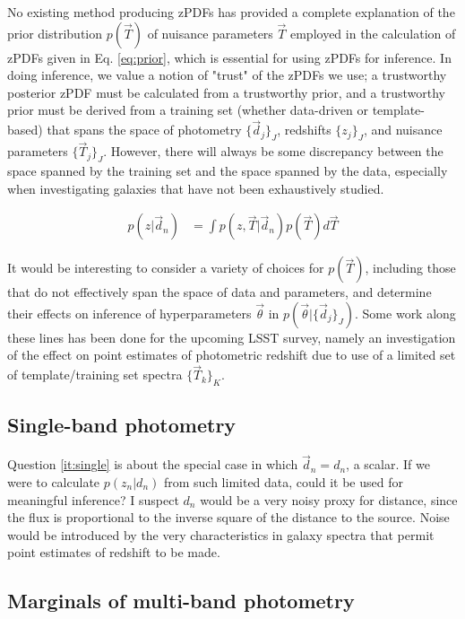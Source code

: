 \documentclass[12pt, onecolumn]{emulateapj}
\begin{document}
No existing method producing zPDFs has provided a complete explanation of the prior distribution $p(\vec{T})$ of nuisance parameters $\vec{T}$ employed in the calculation of zPDFs given in Eq. \ref{eq:prior}, which is essential for using zPDFs for inference.  In doing inference, we value a notion of "trust" of the zPDFs we use; a trustworthy posterior zPDF must be calculated from a trustworthy prior, and a trustworthy prior must be derived from a training set (whether data-driven or template-based) that spans the space of photometry $\{\vec{d}_{j}\}_{J}$, redshifts $\{z_{j}\}_{J}$, and nuisance parameters $\{\vec{T}_{j}\}_{J}$.  However, there will always be some discrepancy between the space spanned by the training set and the space spanned by the data, especially when investigating galaxies that have not been exhaustively studied.   

\begin{align}
\label{eq:prior}
p(z|\vec{d}_{n}) &= \int p(z,\vec{T}|\vec{d}_{n})p(\vec{T})d\vec{T}
\end{align}

It would be interesting to consider a variety of choices for $p(\vec{T})$, including those that do not effectively span the space of data and parameters, and determine their effects on inference of hyperparameters $\vec{\theta}$ in $p(\vec{\theta}|\{\vec{d}_{j}\}_{J})$.  Some work along these lines has been done for the upcoming LSST survey, namely an investigation of the effect on point estimates of photometric redshift due to use of a limited set of template/training set spectra $\{\vec{T}_{k}\}_{K}$.  \citep{abe09}

\subsection{Single-band photometry}

Question \ref{it:single} is about the special case in which $\vec{d}_{n}=d_{n}$, a scalar.  If we were to calculate $p(z_{n}|d_{n})$ from such limited data, could it be used for meaningful inference?  I suspect $d_{n}$ would be a very noisy proxy for distance, since the flux is proportional to the inverse square of the distance to the source.  Noise would be introduced by the very characteristics in galaxy spectra that permit point estimates of redshift to be made.

\subsection{Marginals of multi-band photometry}
\end{document}
